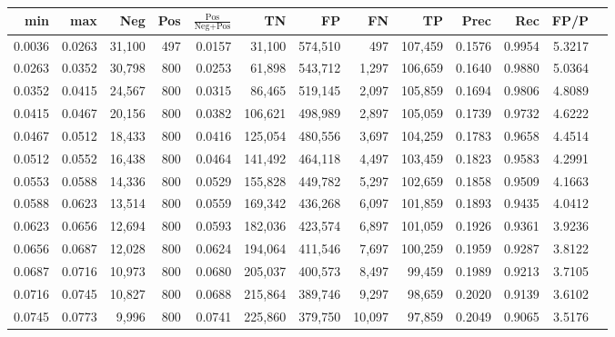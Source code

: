 \begin{tabular}{rrrrrrrrrrrrr}
\toprule
   min &    max &    Neg &   Pos & $\frac{\text{Pos}}{\text{Neg}+\text{Pos}}$ &      TN &      FP &      FN &      TP &   Prec &    Rec &   FP/P \\
\midrule
0.0036 & 0.0263 & 31,100 &   497 &                                     0.0157 &  31,100 & 574,510 &     497 & 107,459 & 0.1576 & 0.9954 & 5.3217 \\
0.0263 & 0.0352 & 30,798 &   800 &                                     0.0253 &  61,898 & 543,712 &   1,297 & 106,659 & 0.1640 & 0.9880 & 5.0364 \\
0.0352 & 0.0415 & 24,567 &   800 &                                     0.0315 &  86,465 & 519,145 &   2,097 & 105,859 & 0.1694 & 0.9806 & 4.8089 \\
0.0415 & 0.0467 & 20,156 &   800 &                                     0.0382 & 106,621 & 498,989 &   2,897 & 105,059 & 0.1739 & 0.9732 & 4.6222 \\
0.0467 & 0.0512 & 18,433 &   800 &                                     0.0416 & 125,054 & 480,556 &   3,697 & 104,259 & 0.1783 & 0.9658 & 4.4514 \\
0.0512 & 0.0552 & 16,438 &   800 &                                     0.0464 & 141,492 & 464,118 &   4,497 & 103,459 & 0.1823 & 0.9583 & 4.2991 \\
0.0553 & 0.0588 & 14,336 &   800 &                                     0.0529 & 155,828 & 449,782 &   5,297 & 102,659 & 0.1858 & 0.9509 & 4.1663 \\
0.0588 & 0.0623 & 13,514 &   800 &                                     0.0559 & 169,342 & 436,268 &   6,097 & 101,859 & 0.1893 & 0.9435 & 4.0412 \\
0.0623 & 0.0656 & 12,694 &   800 &                                     0.0593 & 182,036 & 423,574 &   6,897 & 101,059 & 0.1926 & 0.9361 & 3.9236 \\
0.0656 & 0.0687 & 12,028 &   800 &                                     0.0624 & 194,064 & 411,546 &   7,697 & 100,259 & 0.1959 & 0.9287 & 3.8122 \\
0.0687 & 0.0716 & 10,973 &   800 &                                     0.0680 & 205,037 & 400,573 &   8,497 &  99,459 & 0.1989 & 0.9213 & 3.7105 \\
0.0716 & 0.0745 & 10,827 &   800 &                                     0.0688 & 215,864 & 389,746 &   9,297 &  98,659 & 0.2020 & 0.9139 & 3.6102 \\
0.0745 & 0.0773 &  9,996 &   800 &                                     0.0741 & 225,860 & 379,750 &  10,097 &  97,859 & 0.2049 & 0.9065 & 3.5176 \\

\end{tabular}
